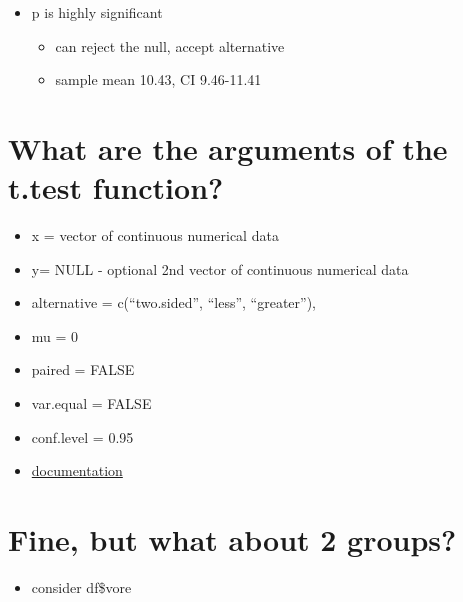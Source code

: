\documentclass[
]{book}
\newenvironment{Shaded}{\begin{snugshade}}{\end{snugshade}}
\newcommand{\KeywordTok}[1]{\textcolor[rgb]{0.13,0.29,0.53}{\textbf{#1}}}
\newcommand{\NormalTok}[1]{#1}
\newcommand{\OperatorTok}[1]{\textcolor[rgb]{0.81,0.36,0.00}{\textbf{#1}}}
\providecommand{\tightlist}{%
  \setlength{\itemsep}{0pt}\setlength{\parskip}{0pt}}
\begin{document}
\begin{itemize}
\tightlist
\item
  p is highly significant

  \begin{itemize}
  \tightlist
  \item
    can reject the null, accept alternative
  \item
    sample mean 10.43, CI 9.46-11.41
  \end{itemize}
\end{itemize}

\hypertarget{what-are-the-arguments-of-the-t.test-function-1}{%
\section{What are the arguments of the t.test function?}\label{what-are-the-arguments-of-the-t.test-function-1}}

\begin{itemize}
\tightlist
\item
  x = vector of continuous numerical data
\item
  y= NULL - optional 2nd vector of continuous numerical data
\item
  alternative = c(``two.sided'', ``less'', ``greater''),
\item
  mu = 0
\item
  paired = FALSE
\item
  var.equal = FALSE
\item
  conf.level = 0.95
\item
  \href{https://www.rdocumentation.org/packages/stats/versions/3.5.1/topics/t.test}{documentation}
\end{itemize}

\hypertarget{fine-but-what-about-2-groups-1}{%
\section{Fine, but what about 2 groups?}\label{fine-but-what-about-2-groups-1}}

\begin{itemize}
\tightlist
\item
  consider df\$vore
\end{itemize}

\begin{Shaded}
\end{Shaded}
\end{document}
